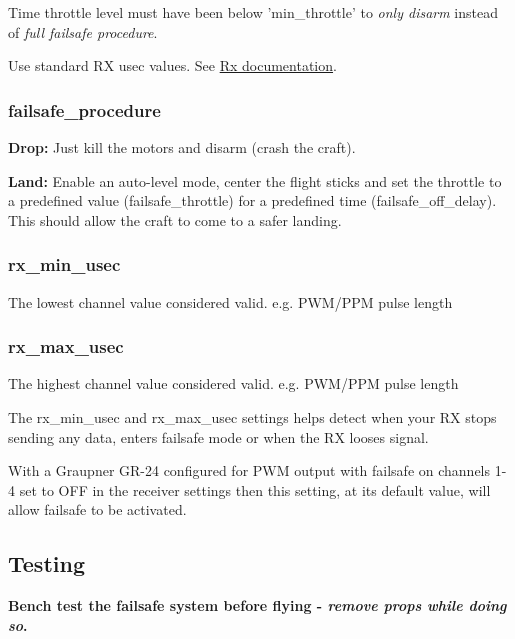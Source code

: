 Time throttle level must have been below 'min\+\_\+throttle' to {\itshape only disarm} instead of {\itshape full failsafe procedure}.

Use standard R\+X usec values. See \hyperlink{Rx_8md}{Rx documentation}.

\subsubsection*{{\ttfamily failsafe\+\_\+procedure}}


\begin{DoxyItemize}
\item {\bfseries Drop\+:} Just kill the motors and disarm (crash the craft).
\item {\bfseries Land\+:} Enable an auto-\/level mode, center the flight sticks and set the throttle to a predefined value ({\ttfamily failsafe\+\_\+throttle}) for a predefined time ({\ttfamily failsafe\+\_\+off\+\_\+delay}). This should allow the craft to come to a safer landing.
\end{DoxyItemize}

\subsubsection*{{\ttfamily rx\+\_\+min\+\_\+usec}}

The lowest channel value considered valid. e.\+g. P\+W\+M/\+P\+P\+M pulse length

\subsubsection*{{\ttfamily rx\+\_\+max\+\_\+usec}}

The highest channel value considered valid. e.\+g. P\+W\+M/\+P\+P\+M pulse length

The {\ttfamily rx\+\_\+min\+\_\+usec} and {\ttfamily rx\+\_\+max\+\_\+usec} settings helps detect when your R\+X stops sending any data, enters failsafe mode or when the R\+X looses signal.

With a Graupner G\+R-\/24 configured for P\+W\+M output with failsafe on channels 1-\/4 set to O\+F\+F in the receiver settings then this setting, at its default value, will allow failsafe to be activated.

\subsection*{Testing}

{\bfseries Bench test the failsafe system before flying -\/ {\itshape remove props while doing so}.}


